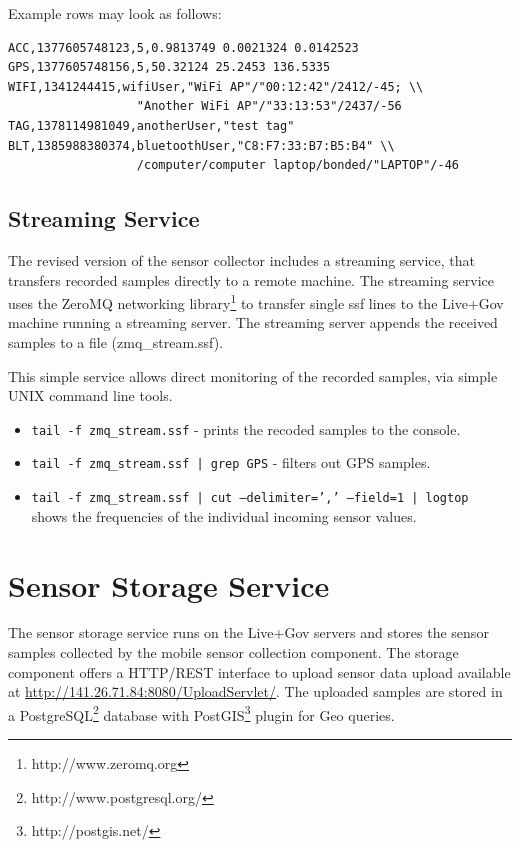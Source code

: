 Example rows may look as follows:
\small
\begin{verbatim}
ACC,1377605748123,5,0.9813749 0.0021324 0.0142523
GPS,1377605748156,5,50.32124 25.2453 136.5335
WIFI,1341244415,wifiUser,"WiFi AP"/"00:12:42"/2412/-45; \\
                  "Another WiFi AP"/"33:13:53"/2437/-56
TAG,1378114981049,anotherUser,"test tag"
BLT,1385988380374,bluetoothUser,"C8:F7:33:B7:B5:B4" \\
                  /computer/computer laptop/bonded/"LAPTOP"/-46
\end{verbatim}
\normalsize

\subsection{Streaming Service}\label{sec:straming}

The revised version of the sensor collector includes a streaming
service, that transfers recorded samples directly to a remote machine.
The streaming service uses the ZeroMQ networking
library\footnote{http://www.zeromq.org} to transfer single ssf lines
to the Live+Gov machine running a streaming server. The streaming
server appends the received samples to a file (zmq\_stream.ssf).

This simple service allows direct monitoring of the recorded samples,
via simple UNIX command line tools. 
\begin{itemize}
\item \texttt{tail -f zmq\_stream.ssf} - prints the recoded samples to the console.
\item \texttt{tail -f zmq\_stream.ssf | grep GPS} - filters out GPS samples.
\item \texttt{tail -f zmq\_stream.ssf | cut --delimiter=',' --field=1 | logtop}\\
  shows the frequencies of the individual incoming sensor values.
\end{itemize}

\section{Sensor Storage Service}

The sensor storage service runs on the Live+Gov servers and stores the
sensor samples collected by the mobile sensor collection component.
The storage component offers a HTTP/REST interface to upload sensor
data upload available at
\url{http://141.26.71.84:8080/UploadServlet/}.  The uploaded samples
are stored in a PostgreSQL\footnote{http://www.postgresql.org/}
database with PostGIS\footnote{http://postgis.net/} plugin for Geo
queries.


